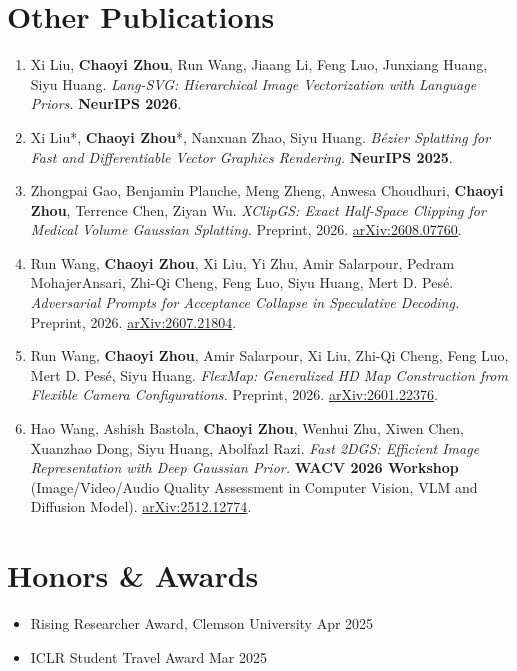 \documentclass[letterpaper,10pt]{article}
\newcommand{\when}[1]{{\color{muted}#1}}
\newcommand{\dated}[2]{\item #1 \hfill \when{#2}}
\newcommand{\venue}[1]{\textbf{\color{accent}#1}}
\newcommand{\me}{\textbf{Chaoyi Zhou}}
\begin{document}
\section{Other Publications}
\begin{enumerate}[resume]

\item Xi Liu, \me, Run Wang, Jiaang Li, Feng Luo, Junxiang Huang, Siyu Huang.
\textit{Lang-SVG: Hierarchical Image Vectorization with Language Priors.}
\venue{NeurIPS 2026}.

\item Xi Liu*, \me*, Nanxuan Zhao, Siyu Huang.
\textit{B\'ezier Splatting for Fast and Differentiable Vector Graphics Rendering.}
\venue{NeurIPS 2025}.

\item Zhongpai Gao, Benjamin Planche, Meng Zheng, Anwesa Choudhuri, \me, Terrence Chen, Ziyan Wu.
\textit{XClipGS: Exact Half-Space Clipping for Medical Volume Gaussian Splatting.}
{\color{muted}Preprint, 2026.} \href{https://arxiv.org/abs/2608.07760}{arXiv:2608.07760}.

\item Run Wang, \me, Xi Liu, Yi Zhu, Amir Salarpour, Pedram MohajerAnsari, Zhi-Qi Cheng, Feng Luo, Siyu Huang, Mert D. Pes\'e.
\textit{Adversarial Prompts for Acceptance Collapse in Speculative Decoding.}
{\color{muted}Preprint, 2026.} \href{https://arxiv.org/abs/2607.21804}{arXiv:2607.21804}.

\item Run Wang, \me, Amir Salarpour, Xi Liu, Zhi-Qi Cheng, Feng Luo, Mert D. Pes\'e, Siyu Huang.
\textit{FlexMap: Generalized HD Map Construction from Flexible Camera Configurations.}
{\color{muted}Preprint, 2026.} \href{https://arxiv.org/abs/2601.22376}{arXiv:2601.22376}.

\item Hao Wang, Ashish Bastola, \me, Wenhui Zhu, Xiwen Chen, Xuanzhao Dong, Siyu Huang, Abolfazl Razi.
\textit{Fast 2DGS: Efficient Image Representation with Deep Gaussian Prior.}
\venue{WACV 2026 Workshop} (Image/Video/Audio Quality Assessment in Computer Vision, VLM and Diffusion Model). \href{https://arxiv.org/abs/2512.12774}{arXiv:2512.12774}.

\end{enumerate}

\section{Honors \& Awards}
\begin{itemize}
\dated{Rising Researcher Award, Clemson University}{Apr 2025}
\dated{ICLR Student Travel Award}{Mar 2025}
\end{itemize}
\end{document}
